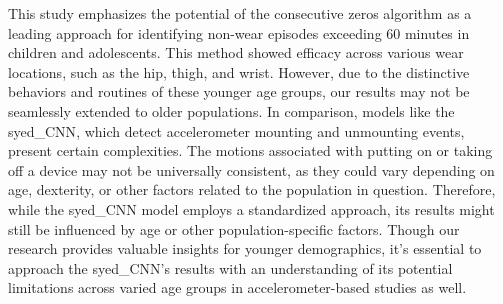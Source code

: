 \documentclass[
  10pt,
]{scrbook}
\begin{document}
This study emphasizes the potential of the consecutive zeros algorithm
as a leading approach for identifying non-wear episodes exceeding 60
minutes in children and adolescents. This method showed efficacy across
various wear locations, such as the hip, thigh, and wrist. However, due
to the distinctive behaviors and routines of these younger age groups,
our results may not be seamlessly extended to older populations. In
comparison, models like the \textsf{syed\_CNN}, which detect
accelerometer mounting and unmounting events, present certain
complexities. The motions associated with putting on or taking off a
device may not be universally consistent, as they could vary depending
on age, dexterity, or other factors related to the population in
question. Therefore, while the \textsf{syed\_CNN} model employs a
standardized approach, its results might still be influenced by age or
other population-specific factors. Though our research provides valuable
insights for younger demographics, it's essential to approach the
\textsf{syed\_CNN}'s results with an understanding of its potential
limitations across varied age groups in accelerometer-based studies as
well.
\end{document}
